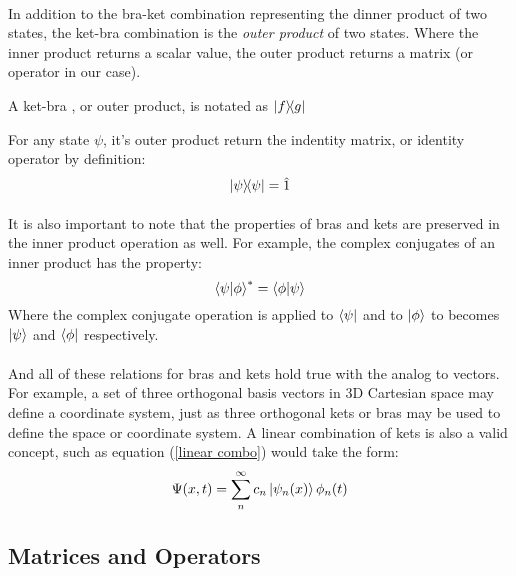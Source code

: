 \documentclass[12pt,letterpaper]{book}
\begin{document}
\paragraph*{}In addition to the bra-ket combination representing the dinner product of two states, the ket-bra combination is the \textit{outer product} of two states. Where the inner product returns a scalar value, the outer product returns a matrix (or operator in our case). 
\begin{center}
A ket-bra , or outer product, is notated as $\ketbra{f}{g}$
\end{center}
For any state $\psi$, it's outer product return the indentity matrix, or identity operator by definition:
\begin{equation}
\label{outer product}
\ketbra{\psi}{\psi} = \hat{1}
\end{equation}

\paragraph*{}It is also important to note that the properties of bras and kets are preserved in the inner product operation as well. For example, the complex conjugates of an inner product has the property:
\begin{equation}
\braket{\psi}{\phi}^* = \braket{\phi}{\psi} 
\end{equation}
Where the complex conjugate operation is applied to $\bra{\psi}$ and to $\ket{\phi}$ to becomes $\ket{\psi}$ and $\bra{\phi}$ respectively.

\paragraph*{}And all of these relations for bras and kets hold true with the analog to vectors. For example, a set of three orthogonal basis vectors in 3D Cartesian space may define a coordinate system, just as three orthogonal kets or bras may be used to define the space or coordinate system. A linear combination of kets is also a valid concept, such as equation (\ref{linear combo}) would take the form:
\begin{equation}
\label{linear combo kets}
\Psi(x,t) = \sum_n^{\infty} c_n \ket{\psi_n(x)}\phi_n(t)
\end{equation}


\subsection*{Matrices and Operators}
\end{document}
